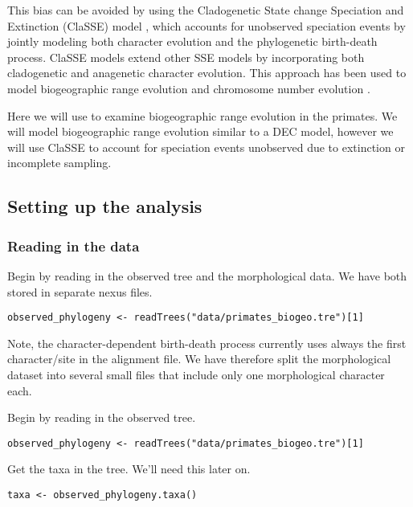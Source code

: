 This bias can be avoided by using the 
Cladogenetic State change Speciation and Extinction
(ClaSSE) model \citep{Goldberg2012},
which accounts for unobserved speciation events
by jointly modeling both character evolution
and the phylogenetic birth-death process.
ClaSSE models extend other SSE models by incorporating both cladogenetic 
and anagenetic character evolution.
This approach has been used to model biogeographic range evolution \citep{Goldberg2011}
and chromosome number evolution \citep{Freyman2017}.

Here we will use \RevBayes to examine biogeographic range evolution in the primates.
We will model biogeographic range evolution similar to a DEC model, 
however we will use ClaSSE to account for speciation events unobserved due 
to extinction or incomplete sampling.

\subsection{Setting up the analysis}

\subsubsection{Reading in the data}

Begin by reading in the observed tree and the morphological data. 
We have both stored in separate nexus files.
{\tt \begin{snugshade*}
\begin{lstlisting}
observed_phylogeny <- readTrees("data/primates_biogeo.tre")[1]
\end{lstlisting}
\end{snugshade*}}
Note, the character-dependent birth-death process currently uses always the first character/site in the alignment file.
We have therefore split the morphological dataset into several small files that include only one morphological character each.

Begin by reading in the observed tree.
{\tt \begin{snugshade*}
\begin{lstlisting}
observed_phylogeny <- readTrees("data/primates_biogeo.tre")[1]
\end{lstlisting}
\end{snugshade*}}

Get the taxa in the tree. We'll need this later on.
{\tt \begin{snugshade*}
\begin{lstlisting}
taxa <- observed_phylogeny.taxa()
\end{lstlisting}
\end{snugshade*}}


